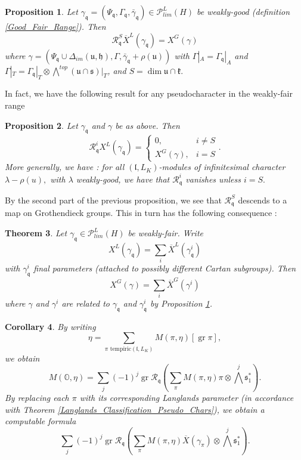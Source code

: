 \documentclass[letterpaper,twosided,11pt]{article}
\theoremstyle{plain}
\newtheorem{theorem}{Theorem}[section]
\newtheorem{proposition}[theorem]{Proposition}
\newtheorem{corollary}[theorem]{Corollary}
\theoremstyle{definition}
\theoremstyle{remark}
\newcommand{\OO}{\mathbb{O}}
\newcommand{\script}[1]{\mathscr{#1}}
\newcommand{\close}[1]{\overline{#1}}
\newcommand{\tensor}{\otimes}
\newcommand{\lie}[1]{\mathfrak{#1}}
\newcommand{\gr}{\operatorname{gr }}
\begin{document}
 \begin{proposition}\label{cohomological_induction_pseudo_chars} 
 	Let $\gamma_{\lie{q}}=(\Psi_\lie{q},\Gamma_\lie{q},\bar{\gamma}_\lie{q})\in \script{P}^L_{lim}(H)$ be weakly-good (definition \ref{Good_Fair_Range}). Then \[ \mathcal{R}_\lie{q}^S \overline{X}^L(\gamma_\lie{q})=X^G(\gamma)\]
	where $\gamma=(\Psi_\lie{q}\cup \Delta_{im}(\lie{u},\lie{h}),\Gamma, \bar{\gamma}_\lie{q}+\rho(\lie{u}))$ with $\Gamma|_A=\Gamma_\lie{q}|_A$ and $\Gamma|_T=\Gamma_\lie{q}|_T\tensor \bigwedge^{top}(\lie{u}\cap \lie{s})|_T$, and $S=\dim \lie{u}\cap \lie{k}.$  
 \end{proposition} 
 
 In fact, we have the following result for any pseudocharacter in the weakly-fair range 
 
 \begin{proposition}\cite[Proposition 4.11]{Vogan1984}
 	Let $\gamma_\lie{q}$ and $\gamma$ be as above. Then \[ \mathcal{R}^i_\lie{q} X^L(\gamma_\lie{q})=\begin{cases} 
		0, & i\neq S\\
		X^G(\gamma),& i=S
	\end{cases} .\]
	 More generally, we have \cite[Proposition 4.13]{Vogan1984}: for all $(\lie{l},L_K)$-modules of infinitesimal character $\lambda-\rho(u),$ with $\lambda$ weakly-good, we have that $\mathcal{R}^i_\lie{q}$ vanishes unless $i=S.$  
 \end{proposition}  
 
By the second part of the previous proposition, we see that $\mathcal{R}_\lie{q}^S$ descends to a map on Grothendieck groups. This in turn has the following consequence \cite[Theorem 4.23]{SpehVogan1980}:
\begin{theorem} 
	Let $\gamma_\lie{q}\in \script{P}_{lim}^L(H)$ be weakly-fair. Write \[ X^L(\gamma_\lie{q})=\sum_{i} \overline{X}^L(\gamma_\lie{q}^i) \]
	with $\gamma_\lie{q}^i$ final parameters (attached to possibly different Cartan subgroups). Then \[ X^G(\gamma)=\sum_i \close{X}^G(\gamma^i) \]
	where $\gamma$ and $\gamma^i$ are related to $\gamma_\lie{q}$ and $\gamma_\lie{q}^i$ by Proposition \ref{cohomological_induction_pseudo_chars}.    
\end{theorem} 
 
 \begin{corollary}\label{Formula_for_Pushforward} 
 	 By writing \[\eta=\sum_{\pi \text{ tempiric} (\lie{l},L_K)} M(\pi,\eta)[\gr \pi],\] we obtain \[ M(\OO,\eta)=\sum_{j}(-1)^j\gr \mathcal{R}_\lie{q}\left(\sum_{\pi} M(\pi,\eta)\pi \tensor \textstyle{\bigwedge^j}\lie{s}_1^*\right).\]
	By replacing each $\pi$ with its corresponding Langlands parameter (in accordance with Theorem \ref{Langlands_Classification_Pseudo_Chars}), we obtain a computable formula \[ \sum_{j}(-1)^j \operatorname{gr} \mathcal{R}_\lie{q}\left(\sum_{\pi} M(\pi,\eta) \overline{X}(\gamma_\pi)\tensor \textstyle{\bigwedge^j}\lie{s}_1^*\right) .\]
 \end{corollary} 
\end{document}
